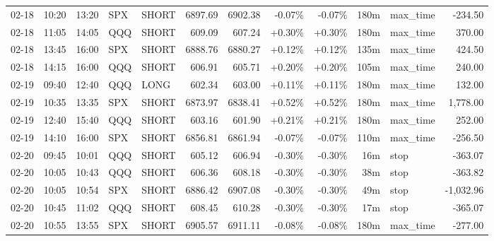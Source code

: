 \documentclass[11pt,a4paper,twoside]{article}
\begin{document}
\begin{center}
\begin{longtable}{>{\color{txtmain}}l l l l l r r r r r >{\color{txtmain}}l r}
02-18 & 10:20 & 13:20 & SPX & SHORT & 6897.69 & 6902.38 & \textcolor{lossred}{-0.07\%} & \textcolor{lossred}{-0.07\%} & 180m & max\_time & \textcolor{lossred}{-234.50} \\
02-18 & 11:05 & 14:05 & QQQ & SHORT & 609.09 & 607.24 & \textcolor{wingreen}{+0.30\%} & \textcolor{wingreen}{+0.30\%} & 180m & max\_time & \textcolor{wingreen}{370.00} \\
02-18 & 13:45 & 16:00 & SPX & SHORT & 6888.76 & 6880.27 & \textcolor{wingreen}{+0.12\%} & \textcolor{wingreen}{+0.12\%} & 135m & max\_time & \textcolor{wingreen}{424.50} \\
02-18 & 14:15 & 16:00 & QQQ & SHORT & 606.91 & 605.71 & \textcolor{wingreen}{+0.20\%} & \textcolor{wingreen}{+0.20\%} & 105m & max\_time & \textcolor{wingreen}{240.00} \\
02-19 & 09:40 & 12:40 & QQQ & LONG & 602.34 & 603.00 & \textcolor{wingreen}{+0.11\%} & \textcolor{wingreen}{+0.11\%} & 180m & max\_time & \textcolor{wingreen}{132.00} \\
02-19 & 10:35 & 13:35 & SPX & SHORT & 6873.97 & 6838.41 & \textcolor{wingreen}{+0.52\%} & \textcolor{wingreen}{+0.52\%} & 180m & max\_time & \textcolor{wingreen}{1,778.00} \\
02-19 & 12:40 & 15:40 & QQQ & SHORT & 603.16 & 601.90 & \textcolor{wingreen}{+0.21\%} & \textcolor{wingreen}{+0.21\%} & 180m & max\_time & \textcolor{wingreen}{252.00} \\
02-19 & 14:10 & 16:00 & SPX & SHORT & 6856.81 & 6861.94 & \textcolor{lossred}{-0.07\%} & \textcolor{lossred}{-0.07\%} & 110m & max\_time & \textcolor{lossred}{-256.50} \\
02-20 & 09:45 & 10:01 & QQQ & SHORT & 605.12 & 606.94 & \textcolor{lossred}{-0.30\%} & \textcolor{lossred}{-0.30\%} & 16m & stop & \textcolor{lossred}{-363.07} \\
02-20 & 10:05 & 10:43 & QQQ & SHORT & 606.36 & 608.18 & \textcolor{lossred}{-0.30\%} & \textcolor{lossred}{-0.30\%} & 38m & stop & \textcolor{lossred}{-363.82} \\
02-20 & 10:05 & 10:54 & SPX & SHORT & 6886.42 & 6907.08 & \textcolor{lossred}{-0.30\%} & \textcolor{lossred}{-0.30\%} & 49m & stop & \textcolor{lossred}{-1,032.96} \\
02-20 & 10:45 & 11:02 & QQQ & SHORT & 608.45 & 610.28 & \textcolor{lossred}{-0.30\%} & \textcolor{lossred}{-0.30\%} & 17m & stop & \textcolor{lossred}{-365.07} \\
02-20 & 10:55 & 13:55 & SPX & SHORT & 6905.57 & 6911.11 & \textcolor{lossred}{-0.08\%} & \textcolor{lossred}{-0.08\%} & 180m & max\_time & \textcolor{lossred}{-277.00} \\

\end{longtable}
\end{center}
\end{document}
